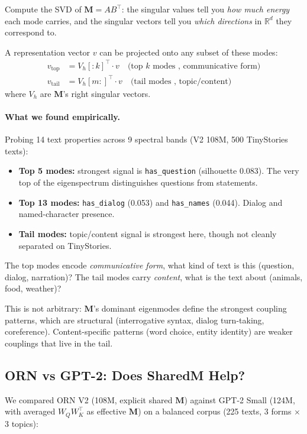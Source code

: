 \documentclass[11pt, a4paper]{article}
\newcommand{\M}{\mathbf{M}}
\newcommand{\R}{\mathbb{R}}
\theoremstyle{remark}
\begin{document}
Compute the SVD of $\M = AB^\top$: the singular values tell you \emph{how much energy} each mode carries, and the singular vectors tell you \emph{which directions} in $\R^d$ they correspond to.

A representation vector $v$ can be projected onto any subset of these modes:
\begin{align}
    v_{\text{top}} &= V_h[{:}k]^\top \cdot v \quad\text{(top $k$ modes ,  communicative form)} \\
    v_{\text{tail}} &= V_h[m{:}]^\top \cdot v \quad\text{(tail modes ,  topic/content)}
\end{align}
where $V_h$ are $\M$'s right singular vectors.

\paragraph{What we found empirically.}
Probing 14 text properties across 9 spectral bands (V2 108M, 500 TinyStories texts):
\begin{itemize}[nosep]
    \item \textbf{Top 5 modes:} strongest signal is \texttt{has\_question} (silhouette 0.083).  The very top of the eigenspectrum distinguishes questions from statements.
    \item \textbf{Top 13 modes:} \texttt{has\_dialog} (0.053) and \texttt{has\_names} (0.044).  Dialog and named-character presence.
    \item \textbf{Tail modes:} topic/content signal is strongest here, though not cleanly separated on TinyStories.
\end{itemize}

The top modes encode \emph{communicative form}, what kind of text is this (question, dialog, narration)?
The tail modes carry \emph{content}, what is the text about (animals, food, weather)?

This is not arbitrary: $\M$'s dominant eigenmodes define the strongest coupling patterns, which are structural (interrogative syntax, dialog turn-taking, coreference).
Content-specific patterns (word choice, entity identity) are weaker couplings that live in the tail.

\subsection{ORN vs GPT-2: Does SharedM Help?}

We compared ORN V2 (108M, explicit shared $\M$) against GPT-2 Small (124M, with averaged $W_Q W_K^\top$ as effective $\M$) on a balanced corpus (225 texts, 3 forms $\times$ 3 topics):
\end{document}
